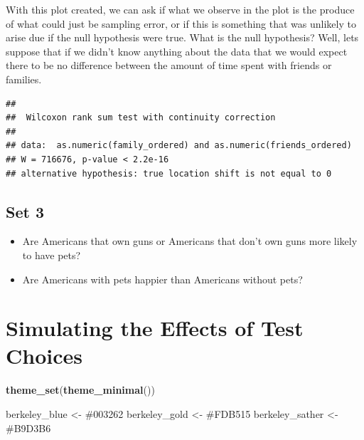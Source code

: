 \documentclass[
]{book}
\newenvironment{Shaded}{\begin{snugshade}}{\end{snugshade}}
\newcommand{\AttributeTok}[1]{\textcolor[rgb]{0.13,0.29,0.53}{#1}}
\newcommand{\ConstantTok}[1]{\textcolor[rgb]{0.56,0.35,0.01}{#1}}
\newcommand{\DocumentationTok}[1]{\textcolor[rgb]{0.56,0.35,0.01}{\textbf{\textit{#1}}}}
\newcommand{\FunctionTok}[1]{\textcolor[rgb]{0.13,0.29,0.53}{\textbf{#1}}}
\newcommand{\NormalTok}[1]{#1}
\newcommand{\OtherTok}[1]{\textcolor[rgb]{0.56,0.35,0.01}{#1}}
\newcommand{\SpecialCharTok}[1]{\textcolor[rgb]{0.81,0.36,0.00}{\textbf{#1}}}
\newcommand{\StringTok}[1]{\textcolor[rgb]{0.31,0.60,0.02}{#1}}
\providecommand{\tightlist}{%
  \setlength{\itemsep}{0pt}\setlength{\parskip}{0pt}}
\theoremstyle{definition}
\theoremstyle{definition}
\theoremstyle{definition}
\theoremstyle{definition}
\theoremstyle{remark}
\begin{document}
With this plot created, we can ask if what we observe in the plot is the produce of what could just be sampling error, or if this is something that was unlikely to arise due if the null hypothesis were true. What is the null hypothesis? Well, lets suppose that if we didn't know anything about the data that we would expect there to be no difference between the amount of time spent with friends or families.

\begin{Shaded}
\end{Shaded}

\begin{verbatim}
## 
##  Wilcoxon rank sum test with continuity correction
## 
## data:  as.numeric(family_ordered) and as.numeric(friends_ordered)
## W = 716676, p-value < 2.2e-16
## alternative hypothesis: true location shift is not equal to 0
\end{verbatim}

\subsection{Set 3}\label{set-3}

\begin{itemize}
\tightlist
\item
  Are Americans that own guns or Americans that don't own guns more likely to have pets?
\item
  Are Americans with pets happier than Americans without pets?
\end{itemize}

\section{Simulating the Effects of Test Choices}\label{simulating-the-effects-of-test-choices}

\begin{Shaded}
\begin{Highlighting}[]
\FunctionTok{theme\_set}\NormalTok{(}\FunctionTok{theme\_minimal}\NormalTok{())}

\NormalTok{berkeley\_blue   }\OtherTok{\textless{}{-}} \StringTok{\textquotesingle{}\#003262\textquotesingle{}}
\NormalTok{berkeley\_gold   }\OtherTok{\textless{}{-}} \StringTok{\textquotesingle{}\#FDB515\textquotesingle{}}
\NormalTok{berkeley\_sather }\OtherTok{\textless{}{-}} \StringTok{\textquotesingle{}\#B9D3B6\textquotesingle{}}
\end{Highlighting}
\end{Shaded}
\end{document}
